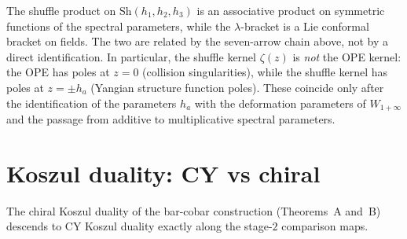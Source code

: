 \begin{remark}[Shuffle product \texorpdfstring{$\neq$}{!=} \texorpdfstring{$\lambda$}{lambda}-bracket]
\label{rem:shuffle-neq-lambda}
The shuffle product on $\mathrm{Sh}(h_1, h_2, h_3)$ is an associative product on symmetric functions of the spectral parameters, while the $\lambda$-bracket is a Lie conformal bracket on fields. The two are related by the seven-arrow chain above, not by a direct identification. In particular, the shuffle kernel $\zeta(z)$ is \emph{not} the OPE kernel: the OPE has poles at $z = 0$ (collision singularities), while the shuffle kernel has poles at $z = \pm h_a$ (Yangian structure function poles). These coincide only after the identification of the parameters $h_a$ with the deformation parameters of $W_{1+\infty}$ and the passage from additive to multiplicative spectral parameters.
\end{remark}



\section{Koszul duality: CY vs chiral}
\label{sec:koszul-cy-chiral}

The chiral Koszul duality of the bar-cobar construction (Theorems~A and~B) descends to CY
Koszul duality exactly along the stage-$2$ comparison maps.

